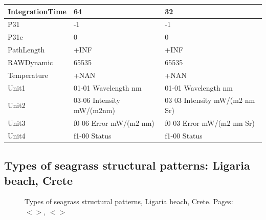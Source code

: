 \documentclass[11pt]{article}
\begin{document}
\begin{appendices}
\begin{table}[H]
\begin{tabular}{| p{3cm} | p{3cm} | p{5cm} |}
	   IntegrationTime & 64 & 32 \\ \hline
	    P31 & -1 & -1 \\ \hline
	   P31e & 0 & 0 \\ \hline
	   PathLength & +INF & +INF \\ \hline
	   RAWDynamic & 65535 & 65535 \\ \hline
	   Temperature & +NAN & +NAN \\ \hline
	   Unit1 & 01-01 Wavelength nm &  01-01 Wavelength nm \\ \hline
	   Unit2 & 03-06 Intensity mW/(m2nm) & 03 03 Intensity mW/(m2 nm Sr) \\ \hline
	   Unit3 & f0-06 Error mW/(m2 nm) & f0-03 Error mW/(m2 nm Sr) \\ \hline
	  Unit4 & f1-00 Status & f1-00 Status \\ \hline
	\end{tabular}
\end{table}
\pagebreak

\subsection[Types of seagrass structural patterns: Ligaria beach, Crete]{Types of seagrass structural patterns: Ligaria beach, Crete}

\begin{figure}[h]
	\centering
	\hspace{1mm}
	\hspace{1mm}
	\caption{Types of seagrass structural patterns, Ligaria beach, Crete.  Pages: $<$\pageref{page-27}$>$, $<$\pageref{page-28}$>$}
	\label{fig:A.3}
\end{figure}


\end{appendices}
\end{document}
